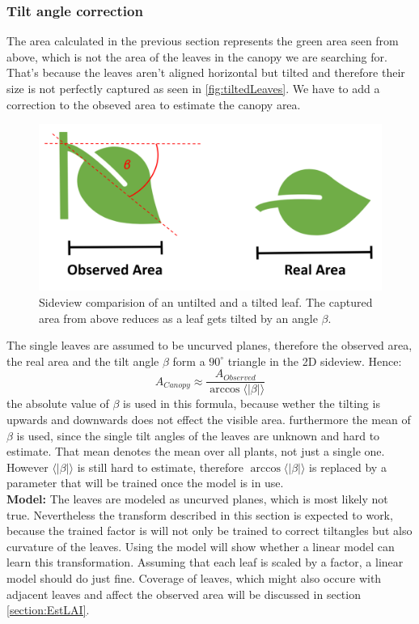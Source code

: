 \subsubsection{Tilt angle correction}
The area calculated in the previous section represents the green area seen from above, which is not the area of the leaves in the canopy we are searching for. That's because the leaves aren't aligned horizontal but tilted and therefore their size is not perfectly captured as seen in \ref{fig:tiltedLeaves}. We have to add a correction to the obseved area to estimate the canopy area.\\
   \begin{figure}[H]
       \centering
       \includegraphics[scale=0.6]{tiltedLeaf.PNG}
       \caption{Sideview comparision of an untilted and a tilted leaf. The captured area from above reduces as a leaf gets tilted by an angle $\beta$.}
       \label{fig:tiltedLeaf}
   \end{figure}{}
The single leaves are assumed to be uncurved planes, therefore the observed area, the real area and the tilt angle $\beta$ form a $90^{\circ}$ triangle in the 2D sideview. Hence:
$$A_{Canopy} \approx \frac{A_{Observed}}{\arccos \langle |\beta |\rangle }$$
the absolute value of $\beta$ is used in this formula, because wether the tilting is upwards and downwards does not effect the visible area. furthermore the mean of $\beta$ is used, since the single tilt angles of the leaves are unknown and hard to estimate. That mean denotes the mean over all plants, not just a single one. However $\langle |\beta |\rangle$ is still hard to estimate, therefore $\arccos \langle |\beta |\rangle$ is replaced by a parameter that will be trained once the model is in use.\\
\textbf{Model: } The leaves are modeled as uncurved planes, which is most likely not true. Nevertheless the transform described in this section is expected to work, because the trained factor is will not only be trained to correct tiltangles but also curvature of the leaves. Using the model will show whether a linear model can learn this transformation. Assuming that each leaf is scaled by a factor, a linear model should do just fine. Coverage of leaves, which might also occure with adjacent leaves and affect the observed area will be discussed in section \ref{section:EstLAI}.
